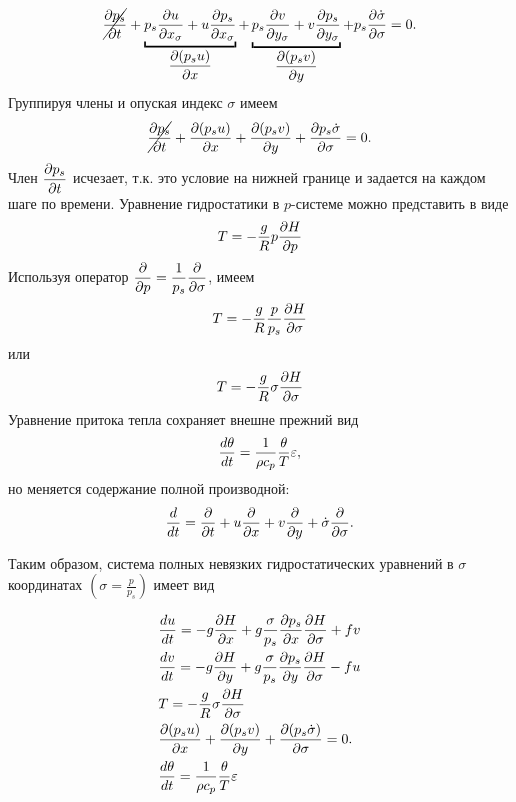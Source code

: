 \begin{equation*}
    \cancel{\pd{p_s}{t}} + 
    \underbracket{p_s\pd{u}{x_{\sigma}} + u\pd{p_s}{x_{\sigma}}}_{\pd{(p_su)}{x}} + 
    \underbracket{p_s\pd{v}{y_{\sigma}} + v\pd{p_s}{y_{\sigma}}}_{\pd{(p_sv)}{y}} + 
    p_s\pd{\dot{\sigma}}{\sigma} = 0.
\end{equation*}
Группируя члены и опуская индекс $\sigma$ имеем
\begin{equation}
    \label{eq:consm2}
    \cancel{\displaystyle\frac{\partial p_s}{\partial t}} + \displaystyle\frac{\partial (p_su)}{\partial x} + \displaystyle\frac{\partial (p_sv)}{\partial y} + \displaystyle\frac{\partial p_s\dot{\sigma}}{\partial \sigma} = 0.
\end{equation}
{\color{red} Член $\displaystyle\frac{\partial p_s}{\partial t}$ исчезает, т.к. это условие на нижней границе и задается на каждом шаге по времени.}
Уравнение гидростатики в $p$-системе можно представить в виде
\begin{equation*}
    T=-\frac{g}{R}p\displaystyle\frac{\partial H}{\partial p}
\end{equation*}
Используя оператор $\displaystyle\frac{\partial }{\partial p}=\frac{1}{p_s}\displaystyle\frac{\partial }{\partial \sigma}$, имеем
\begin{equation*}
    T=-\frac{g}{R}\frac{p}{p_s} \displaystyle\frac{\partial H}{\partial \sigma}
\end{equation*}
или 
\begin{equation}
    T=-\frac{g}{R}\sigma\displaystyle\frac{\partial H}{\partial \sigma}
\end{equation}
Уравнение притока тепла сохраняет внешне прежний вид
\begin{equation*}
    \displaystyle\frac{d \theta}{d t}=\frac{1}{\rho c_p}\frac{\theta}{T}\varepsilon,
\end{equation*}
но меняется содержание полной производной:
\begin{equation}
    \label{eq:td2sigma}
    \displaystyle\frac{d }{d t}=\displaystyle\frac{\partial }{\partial t}+u\displaystyle\frac{\partial }{\partial x}+v\displaystyle\frac{\partial }{\partial y}+\dot{\sigma}\displaystyle\frac{\partial }{\partial \sigma}.
\end{equation}

Таким образом, система полных невязких гидростатических уравнений в $\sigma$ координатах $ \left( \sigma=\frac{p}{p_s} \right)$ имеет вид

\begin{align}
    \label{eq:dudt2sigma}
    &\displaystyle\frac{d u}{d t} = -g\displaystyle\frac{\partial H}{\partial x}+g\frac{\sigma}{p_s}\displaystyle\frac{\partial p_s}{\partial x}\displaystyle\frac{\partial H}{\partial \sigma}+fv \\
    \label{eq:dvdt2sigma}
    &\displaystyle\frac{d v}{d t} = -g\displaystyle\frac{\partial H}{\partial y}+g\frac{\sigma}{p_s}\displaystyle\frac{\partial p_s}{\partial y}\displaystyle\frac{\partial H}{\partial \sigma}-fu \\
    \label{eq:hydrostat2sigma}
    &T=-\frac{g}{R}\sigma\displaystyle\frac{\partial H}{\partial \sigma} \\
    \label{eq:consm2sigma}
    &\displaystyle\frac{\partial (p_su)}{\partial x} + \displaystyle\frac{\partial (p_sv)}{\partial y} + \displaystyle\frac{\partial (p_s\dot{\sigma})}{\partial \sigma} = 0. \\
    \label{eq:temp2sigma}
    &\displaystyle\frac{d \theta}{d t}=\frac{1}{\rho c_p}\frac{\theta}{T}\varepsilon 
\end{align}

